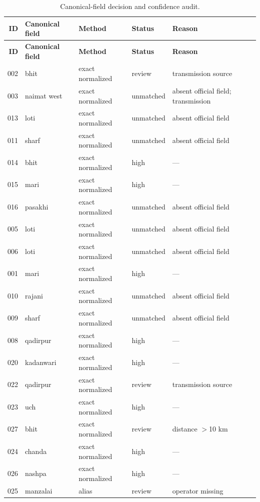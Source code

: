 \documentclass[3p,times,authoryear]{elsarticle}
\begin{document}
\begin{longtable}{@{}rp{}p{}p{}p{}@{}}
\caption{Canonical-field decision and confidence audit.}\label{tab:s1decision}\\
\toprule
\textbf{ID} & \textbf{Canonical field} & \textbf{Method} & \textbf{Status} &
\textbf{Reason} \\
\midrule
\endfirsthead
\toprule
\textbf{ID} & \textbf{Canonical field} & \textbf{Method} & \textbf{Status} &
\textbf{Reason} \\
\midrule
\endhead
002 & bhit & exact normalized & review & transmission source \\
003 & naimat west & exact normalized & unmatched & absent official field; transmission \\
013 & loti & exact normalized & unmatched & absent official field \\
011 & sharf & exact normalized & unmatched & absent official field \\
014 & bhit & exact normalized & high & --- \\
015 & mari & exact normalized & high & --- \\
016 & pasakhi & exact normalized & unmatched & absent official field \\
005 & loti & exact normalized & unmatched & absent official field \\
006 & loti & exact normalized & unmatched & absent official field \\
001 & mari & exact normalized & high & --- \\
010 & rajani & exact normalized & unmatched & absent official field \\
009 & sharf & exact normalized & unmatched & absent official field \\
008 & qadirpur & exact normalized & high & --- \\
020 & kadanwari & exact normalized & high & --- \\
022 & qadirpur & exact normalized & review & transmission source \\
023 & uch & exact normalized & high & --- \\
027 & bhit & exact normalized & review & distance $>$10 km \\
024 & chanda & exact normalized & high & --- \\
026 & nashpa & exact normalized & high & --- \\
025 & manzalai & alias & review & operator missing \\
\bottomrule
\end{longtable}
\normalsize
\end{document}
